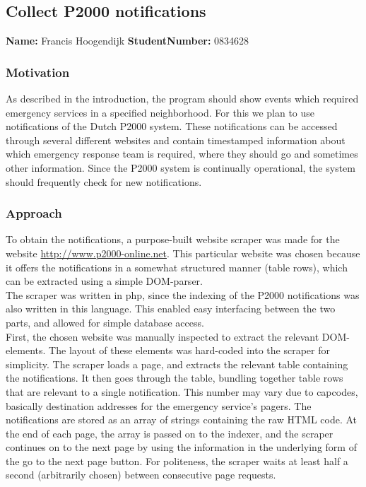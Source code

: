 \subsection{Collect P2000 notifications}
\textbf{Name:} Francis Hoogendijk \indent \textbf{StudentNumber:} 0834628

\subsubsection*{Motivation}
As described in the introduction, the program should show events which required emergency services in a specified neighborhood. For this we plan to use notifications of the Dutch P2000 system. These notifications can be accessed through several different websites and contain timestamped information about which emergency response team is required, where they should go and sometimes other information. Since the P2000 system is continually operational, the system should frequently check for new notifications.

\subsubsection*{Approach}
To obtain the notifications, a purpose-built website scraper was made for the website \url{http://www.p2000-online.net}. This particular website was chosen because it offers the notifications in a somewhat structured manner (table rows), which can be extracted using a simple DOM-parser.\\

The scraper was written in php, since the indexing of the P2000 notifications was also written in this language. This enabled easy interfacing between the two parts, and allowed for simple database access. \\

First, the chosen website was manually inspected to extract the relevant DOM-elements. The layout of these elements was hard-coded into the scraper for simplicity. The scraper loads a page, and extracts the relevant table containing the notifications. It then goes through the table, bundling together table rows that are relevant to a single notification. This number may vary due to capcodes, basically destination addresses for the emergency service's pagers. The notifications are stored as an array of strings containing the raw HTML code. At the end of each page, the array is passed on to the indexer, and the scraper continues on to the next page by using the information in the underlying form of the go to the next page button. For politeness, the scraper waits at least half a second (arbitrarily chosen) between consecutive page requests.\\


